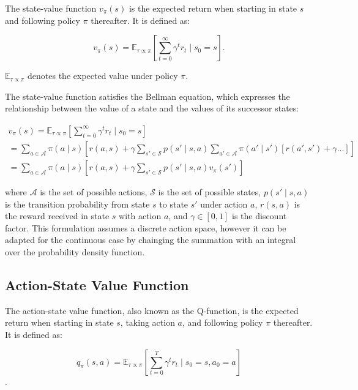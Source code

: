 The state-value function $v_{\pi}(s)$ is the expected return when starting in state $s$ and following policy $\pi$ thereafter. It is defined as:

\begin{equation}
    v_{\pi}(s) = \mathbb{E}_{\tau \propto \pi}\left[\sum_{t=0}^{\infty} \gamma^t r_t \mid s_0 = s\right].
\end{equation}

$\mathbb{E}_{\tau \propto \pi}$ denotes the expected value under policy $\pi$.

The state-value function satisfies the Bellman equation, which expresses the relationship between the value of a state and the values of its successor states:

\begin{equation}
    \label{bootstrap_v}
    \begin{aligned}
        v_{\pi}(s) = \mathbb{E}_{\tau \propto \pi}\left[\sum_{t=0}^{\infty} \gamma^t r_t \mid s_0 = s\right] \\
        = \sum_{a \in \mathcal{A}} \pi(a \mid s) \left[ r(a,s)  + \gamma \sum_{s' \in \mathcal{S}} p(s' \mid s,a) \sum_{a' \in \mathcal{A}} \pi(a' \mid s') \left[ r(a',s') + \gamma ...\right] \right]\\
        = \sum_{a \in \mathcal{A}} \pi(a \mid s) \left[ r(a,s) +  \gamma \sum_{s' \in \mathcal{S}} p(s' \mid s,a) v_{\pi}(s')\right]
    \end{aligned}
\end{equation}

where $\mathcal{A}$ is the set of possible actions, $\mathcal{S}$ is the set of possible states, $p(s' \mid s,a)$ is the transition probability 
from state $s$ to state $s'$ under action $a$, $r(s,a)$ is the reward received in state $s$ with action $a$, and $\gamma \in [0,1]$ is the discount factor. 
This formulation assumes a discrete action space,
however it can be adapted for the continuous case by chainging the summation with an integral over the probability density function.

\subsection{Action-State Value Function}

The action-state value function, also known as the Q-function, is the expected return when starting in state $s$, taking action $a$, and following 
policy $\pi$ thereafter. It is defined as:

\begin{equation}
    q_{\pi}(s, a) = \mathbb{E}_{\tau \propto \pi}\left[\sum_{t=0}^T \gamma^t r_t \mid s_0 = s, a_0=a\right]
\end{equation}
.

